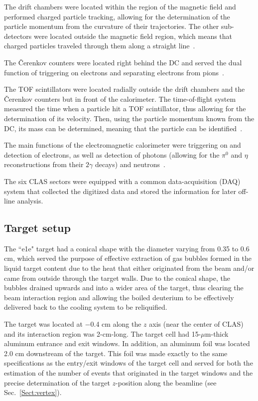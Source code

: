 \documentclass[prc,twocolumn,superscriptaddress,showpacs,amssymb,amsmath,amsfonts,aps,nofootinbib]{revtex4-1}
\begin{document}
The drift chambers were located within the region of the magnetic field and performed charged particle tracking, allowing for the determination of the particle momentum from the curvature of their trajectories. The other sub-detectors were located outside the magnetic field region, which means that charged particles traveled through them along a straight line~\cite{Mestayer:2000we}.

The \v Cerenkov counters were located right behind the DC and served the dual function of triggering on electrons and separating electrons from pions~\cite{Adams:2001kk}. 

The TOF scintillators were located radially outside the drift chambers and the \v Cerenkov counters but in front of the calorimeter. The time-of-flight system measured the time when a particle hit a TOF scintillator, thus allowing for the determination of its velocity. Then, using the particle momentum known from the DC, its mass can be determined, meaning that the particle can be identified~\cite{Smith:1999ii, clas_tof_paddles}.

The main functions of the electromagnetic calorimeter were triggering on and detection of electrons, as well as detection of photons (allowing for the $\pi^{0}$ and $\eta$ reconstructions from their $2\gamma$ decays) and neutrons~\cite{Amarian:2001zs}. 

The six CLAS sectors were equipped with a common data-acquisition (DAQ) system that collected the digitized data and stored the information for later off-line analysis.


\subsection{Target setup}
\label{Sect:target_setup}

The ``e1e" target had a conical shape with the diameter varying from 0.35 to 0.6 cm, which served the purpose of effective extraction of gas bubbles formed in the liquid target content due to the heat that either originated from the beam and/or came from outside through the target walls. Due to the conical shape, the bubbles drained upwards and into a wider area of the target, thus clearing the beam interaction region and allowing the boiled deuterium to be effectively delivered back to the cooling system to be reliquified. 

The target was located at $-$0.4 cm along the $z$ axis (near the center of CLAS) and its interaction region was 2-cm-long. The target cell had 15-$\mu$m-thick aluminum entrance and exit windows. In addition, an aluminum foil was located 2.0 cm downstream of the target. This foil was made exactly to the same specifications as the entry/exit windows of the target cell and served for both the estimation of the number of events that originated in the target windows and the precise determination of the target $z$-position along the beamline (see Sec.\!~\ref{Sect:vertex}).
\end{document}
